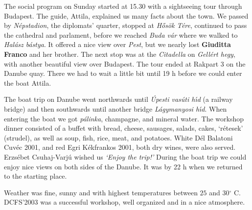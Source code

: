 \documentclass[final]{beatcs}
\begin{document}
\medskip

The social program on Sunday started at 15.30 with a sightseeing tour
through {Budapest}. The guide, {Attila}, explained us many
facts about the town. We passed by {\it N\'{e}pstadion},
the diplomats' quarter, stopped at {\it H\H{o}s\"{o}k T\'{e}re},
continued to pass the cathedral and  parlament, before we reached
{\it Buda v\'{a}r} where we walked to {\it Hal\'{a}sz b\'{a}stya}.
It offered a nice view over {\it Pest}, but
we nearly lost {\bf Giuditta Franco} and her brother.
 The next stop was at the {\it Citadella}
on {\it Gell\'{e}rt hegy}, with another
beautiful view over {Budapest}. The tour ended at {Rakpart 3}
on the Danube quay. There we had to wait a little bit
until 19 h before we could enter the boat {Attila}.

The boat trip on Danube went northwards until 
{\it\'{U}pesti vas\'{u}ti h\'{\i}d}
(a railway bridge) and then southwards until another bridge
{\it L\'{a}gymanyosi h\'{\i}d}. When entering the boat we got 
{\it p\'{a}linka}, champagne, and mineral water. The workshop dinner
consisted of a buffet with bread, cheese, sausages, salads, cakes,
`{r\'{e}tesek}' (strudel), as well as soup, fish, rice, meat, and
potatoes. White {D\'{e}l Balatoni Cuv\'{e}c 2001}, and red
{Egri K\'{e}kfrankos 2001}, both dry wines, were also served.
{Erzs\'{e}bet Csuhaj-Varj\'{u}} wished us {\it `Enjoy the trip!'}
During the boat trip we could enjoy nice views on both sides of the Danube.
It was by 22 h when we returned to the starting place.

\medskip

Weather was fine, sunny and with highest temperatures between
$25$ and $30{}^{\circ}$ C.
{DCFS'2003} was a successful workshop, well organized and in
a nice atmosphere.
\end{document}
